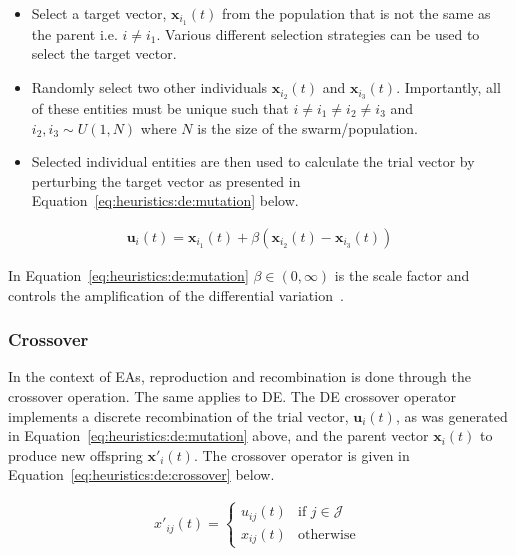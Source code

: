 {\begin{itemize}
	\item Select a target vector, $\boldsymbol{x}_{i_{1}}(t)$ from the population that is not the same as the parent i.e. $i \neq i_{1}$. Various different selection strategies can be used to select the target vector.

	\item Randomly select two other individuals $\boldsymbol{x}_{i_{2}}(t)$ and $\boldsymbol{x}_{i_{3}}(t)$. Importantly, all of these entities must be unique such that $i \neq i_{1} \neq i_{2} \neq i_{3}$ and $i_{2}, i_{3} \sim U(1, N)$ where $N$ is the size of the swarm/population.

	\item Selected individual entities are then used to calculate the trial vector by perturbing the target vector as presented in Equation~\eqref{eq:heuristics:de:mutation} below.
\end{itemize}


\begin{equation}
	\label{eq:heuristics:de:mutation}
	\begin{split}
		\boldsymbol{u}_{i}(t) = \boldsymbol{x}_{i_{1}}(t) + \beta(\boldsymbol{x}_{i_{2}}(t) - \boldsymbol{x}_{i_{3}}(t))
	\end{split}
\end{equation}

In Equation~\eqref{eq:heuristics:de:mutation} $\beta \in (0, \infty)$ is the scale factor and controls the amplification of the differential variation~\cite{ref:engelbrecht:2007}.


\subsubsection{Crossover}\label{sec:heuristics:mh:de:crossover}

In the context of \acp{EA}, reproduction and recombination is done through the crossover operation. The same applies to \acs{DE}. The \acs{DE} crossover operator implements a discrete recombination of the trial vector, $\boldsymbol{u}_{i}(t)$, as was generated in Equation~\eqref{eq:heuristics:de:mutation} above, and the parent vector $\boldsymbol{x}_{i}(t)$ to produce new offspring $\boldsymbol{x}'_{i}(t)$. The crossover operator is given in Equation~\eqref{eq:heuristics:de:crossover} below.

\begin{equation}
	\label{eq:heuristics:de:crossover}
	\begin{split}
		x'_{ij}(t)=
		\begin{cases}
			u_{ij}(t) & \text{if } j \in \mathcal{J} \\
			x_{ij}(t) & \text{otherwise }
		\end{cases}
	\end{split}
\end{equation}

}

